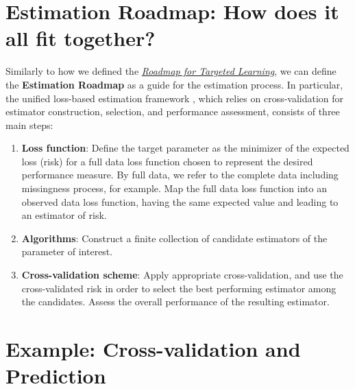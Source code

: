 \documentclass[
  12pt, krantz2,
]{krantz}
\newcommand{\1}{\mathbbm{1}}
\theoremstyle{definition}
\theoremstyle{definition}
\theoremstyle{definition}
\theoremstyle{definition}
\theoremstyle{remark}
\begin{document}
\hypertarget{estimation-roadmap-how-does-it-all-fit-together}{%
\section{Estimation Roadmap: How does it all fit together?}\label{estimation-roadmap-how-does-it-all-fit-together}}

Similarly to how we defined the \protect\hyperlink{roadmap}{\emph{Roadmap for Targeted Learning}}, we
can define the \textbf{Estimation Roadmap} as a guide for the estimation process. In
particular, the unified loss-based estimation framework \citep{vdl2003unified, vdl2004asymptotic, dudoit2005asymptotics, vaart2006oracle, vdl2007super},
which relies on cross-validation for estimator construction,
selection, and performance assessment, consists of three main steps:

\begin{enumerate}
\def\labelenumi{\arabic{enumi}.}
\item
  \textbf{Loss function}:
  Define the target parameter as the minimizer of the expected loss (risk) for a
  full data loss function chosen to represent the desired performance measure. By
  full data, we refer to the complete data including missingness process, for
  example. Map the full data loss function into an observed data loss function,
  having the same expected value and leading to an estimator of risk.
\item
  \textbf{Algorithms}:
  Construct a finite collection of candidate estimators of the parameter of
  interest.
\item
  \textbf{Cross-validation scheme}:
  Apply appropriate cross-validation, and use the cross-validated risk in
  order to select the best performing estimator among the candidates. Assess
  the overall performance of the resulting estimator.
\end{enumerate}

\hypertarget{example-cross-validation-and-prediction}{%
\section{Example: Cross-validation and Prediction}\label{example-cross-validation-and-prediction}}
\end{document}
